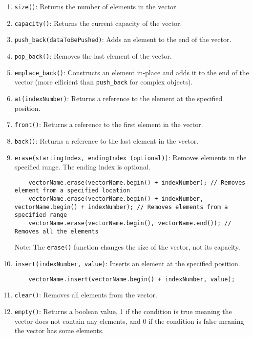 \documentclass{article}
\begin{document}
\begin{enumerate}
    \item \texttt{size()}: Returns the number of elements in the vector.
    \item \texttt{capacity()}: Returns the current capacity of the vector.
    \item \texttt{push\_back(dataToBePushed)}: Adds an element to the end of the vector.
    \item \texttt{pop\_back()}: Removes the last element of the vector.
    \item \texttt{emplace\_back()}: Constructs an element in-place and adds it to the end of the vector (more efficient than \texttt{push\_back} for complex objects).
    \item \texttt{at(indexNumber)}: Returns a reference to the element at the specified position.
    \item \texttt{front()}: Returns a reference to the first element in the vector.
    \item \texttt{back()}: Returns a reference to the last element in the vector.
    \item \texttt{erase(startingIndex, endingIndex (optional))}: Removes elements in the specified range. The ending index is optional.
    
    \begin{lstlisting}
    vectorName.erase(vectorName.begin() + indexNumber); // Removes element from a specified location
    vectorName.erase(vectorName.begin() + indexNumber, vectorName.begin() + indexNumber); // Removes elements from a specified range
    vectorName.erase(vectorName.begin(), vectorName.end()); // Removes all the elements
    \end{lstlisting}

    Note: The \texttt{erase()} function changes the size of the vector, not its capacity.

    \item \texttt{insert(indexNumber, value)}: Inserts an element at the specified position.
    \begin{lstlisting}
    vectorName.insert(vectorName.begin() + indexNumber, value);
    \end{lstlisting}

    \item \texttt{clear()}: Removes all elements from the vector.
    \item \texttt{empty()}: Returns a boolean value, 1 if the condition is true meaning the vector does not contain any elements, and 0 if the condition is false meaning the vector has some elements.


\end{enumerate}
\end{document}
